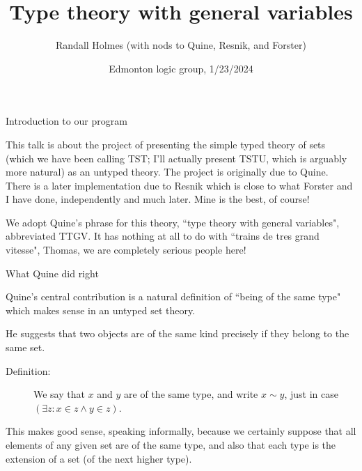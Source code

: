 \documentclass{slides}
\title{Type theory with general variables}
\author{Randall Holmes (with nods to Quine, Resnik, and Forster)}
\date{Edmonton logic group, 1/23/2024}
\begin{document}
\begin{slide}

\maketitle

\end{slide}

\begin{slide}

{\Large Introduction to our program}

This talk is about the project of presenting the simple typed theory of sets (which we have been calling TST;  I'll actually present TSTU, which is arguably more natural) as an untyped theory.  The project is originally due to Quine.  There is a later implementation due to Resnik which is close to what Forster and I have done, independently and much later.  Mine is the best, of course!

We adopt Quine's phrase for this theory, ``type theory with general variables", abbreviated TTGV.  It has nothing at all to do with ``trains de tres grand vitesse", Thomas, we are completely serious people here!

\end{slide}

\begin{slide}

{\Large What Quine did right}

Quine's central contribution is a natural definition of ``being of the same type" which makes sense in an untyped set theory.

He suggests that two objects are of the same kind precisely if they belong to the same set.

\begin{description}

\item[Definition:]  We say that $x$ and $y$ are of the same type, and write $x \sim y$, just in case $(\exists z:x \in z \wedge y \in z)$.

\end{description}

This makes good sense, speaking informally, because we certainly suppose that all elements of any given set are of the same type, and also
that each type is the extension of a set (of the next higher type).

\end{slide}
\end{document}
